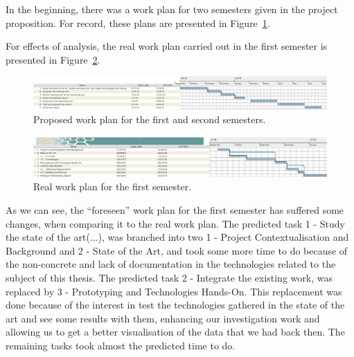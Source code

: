 In the beginning, there was a work plan for two semesters given in the project proposition. For record, these plans are presented in Figure~\ref{fig:proposed_work_plan_semester_1_and_2}.

For effects of analysis, the real work plan carried out in the first semester is presented in Figure~\ref{fig:real_work_plan_semester_1}.

\begin{figure}[H]
    \centering
    \includegraphics[width=1.00\textwidth]{images/proposed_work_plan_semester_1_and_2.pdf}
    \caption{Proposed work plan for the first and second semesters.}
    \label{fig:proposed_work_plan_semester_1_and_2}
\end{figure}

\begin{figure}[H]
    \centering
    \includegraphics[width=1.00\textwidth, height=0.25\textwidth]{images/real_work_plan_semester_1.pdf}
    \caption{Real work plan for the first semester.}
    \label{fig:real_work_plan_semester_1}
\end{figure}

As we can see, the ``foreseen'' work plan for the first semester has suffered some changes, when comparing it to the real work plan. The predicted task 1 - Study the state of the art(...), was branched into two 1 - Project Contextualisation and Background and 2 - State of the Art, and took some more time to do because of the non-concrete and lack of documentation in the technologies related to the subject of this thesis. The predicted task 2 - Integrate the existing work, was replaced by 3 - Prototyping and Technologies Hands-On. This replacement was done because of the interest in test the technologies gathered in the state of the art and see some results with them, enhancing our investigation work and allowing us to get a better visualisation of the data that we had back then. The remaining tasks took almost the predicted time to do.

